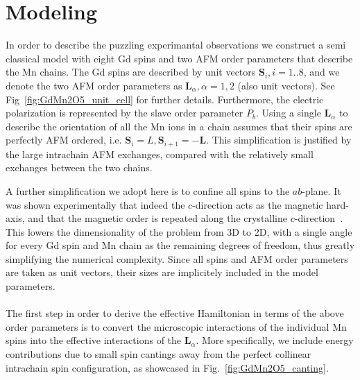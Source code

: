\section{Modeling}
In order to describe the puzzling experimantal observations we construct a semi classical model with eight Gd spins and two AFM order parameters that describe the Mn chains.
The Gd spins are described by unit vectors $\bm{S}_i, i=1..8$, and we denote the two AFM order parameters as $\bm{L}_\alpha, \alpha=1,2$ (also unit vectors). See Fig~\ref{fig:GdMn2O5_unit_cell} for further details.
Furthermore, the electric polarization is represented by the slave order parameter $P_b$.
Using a single $\bm{L}_\alpha$ to describe the orientation of all the Mn ions in a chain assumes that their spins are perfectly AFM ordered, i.e. $\bm{S}_i = L, \bm{S}_{i+1} = - \bm{L}$.
This simplification is justified by the large intrachain AFM exchanges, compared with the relatively small exchanges between the two chains.

A further simplification we adopt here is to confine all spins to the $ab$-plane.
It was shown experimentally that indeed the $c$-direction acts as the magnetic hard-axis, and that the magnetic order is repeated along the crystalline $c$-direction~\cite{Lee13}.
This lowers the dimensionality of the problem from 3D to 2D, with a single angle for every Gd spin and Mn chain as the remaining degrees of freedom, thus greatly simplifying the numerical complexity.
Since all spins and AFM order parameters are taken as unit vectors, their sizes are implicitely included in the model parameters.
\\\\
The first step in order to derive the effective Hamiltonian in terms of the above order parameters is to convert the microscopic interactions of the individual Mn spins into the effective interactions of the $\bm{L}_\alpha$.
More specifically, we include energy contributions due to small spin cantings away from the perfect collinear intrachain spin configuration, as showcased in Fig.~\ref{fig:GdMn2O5_canting}.

\begin{figure*}[h]
    \centering
	\caption{{\bf Energy contributions due to spin canting.} a) The Zeeman contribution due to the weak ferromagnetic moment along the field (H, red arrow), as a result of the spin canting. b) The contribution due to Heisenberg exchange when previously parallel Mn spins are canted towards a more AFM alignment. This is a direct result of the geometric frustration. The collinear configuration is denoted by the black arrows, with the dashed teal arrows showing the orientation due to the slight canting by the angle $\delta \theta$. \label{fig:GdMn2O5_canting}}
\end{figure*}

